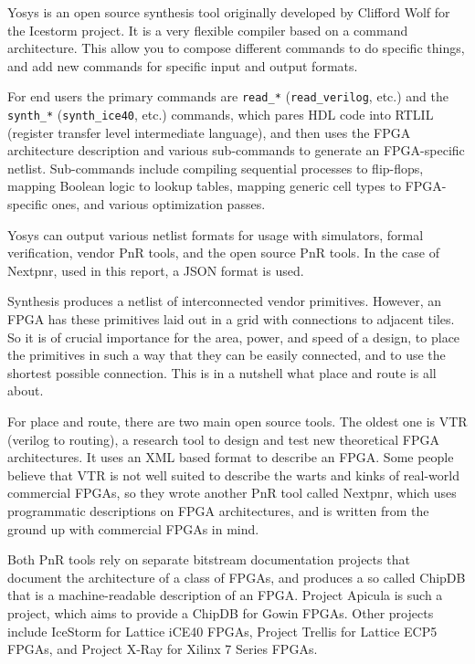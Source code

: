 \documentclass{article}
\begin{document}
Yosys is an open source synthesis tool originally developed by Clifford Wolf for the Icestorm project. It is a very flexible compiler based on a command architecture. This allow you to compose different commands to do specific things, and add new commands for specific input and output formats.

For end users the primary commands are \texttt{read\_*} (\texttt{read\_verilog}, etc.) and the \texttt{synth\_*} (\texttt{synth\_ice40}, etc.) commands, which pares HDL code into RTLIL (register transfer level intermediate language), and then uses the FPGA architecture description and various sub-commands to generate an FPGA-specific netlist. Sub-commands include compiling sequential processes to flip-flops, mapping Boolean logic to lookup tables, mapping generic cell types to FPGA-specific ones, and various optimization passes.

Yosys can output various netlist formats for usage with simulators, formal verification, vendor PnR tools, and the open source PnR tools. In the case of Nextpnr, used in this report, a JSON format is used.

Synthesis produces a netlist of interconnected vendor primitives. However, an FPGA has these primitives laid out in a grid with connections to adjacent tiles. So it is of crucial importance for the area, power, and speed of a design, to place the primitives in such a way that they can be easily connected, and to use the shortest possible connection. This is in a nutshell what place and route is all about.

For place and route, there are two main open source tools. The oldest one is VTR\cite{Rose:2012:VPA:2145694.2145708} (verilog to routing), a research tool to design and test new theoretical FPGA architectures. It uses an XML based format to describe an FPGA. Some people believe that VTR is not well suited to describe the warts and kinks of real-world commercial FPGAs, so they wrote another PnR tool called Nextpnr, which uses programmatic descriptions on FPGA architectures, and is written from the ground up with commercial FPGAs in mind.

Both PnR tools rely on separate bitstream documentation projects that document the architecture of a class of FPGAs, and produces a so called ChipDB that is a machine-readable description of an FPGA. Project Apicula is such a project, which aims to provide a ChipDB for Gowin FPGAs. Other projects include IceStorm\cite{IceStorm} for Lattice iCE40 FPGAs, Project Trellis\cite{Trellis} for Lattice ECP5 FPGAs, and Project X-Ray\cite{xray} for Xilinx 7 Series FPGAs.
\end{document}
